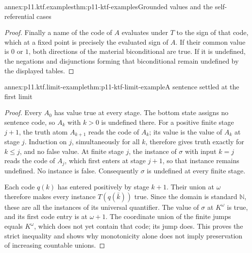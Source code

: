\begin{annexitem}{annex:p11.ktf.examples}{thm:p11-ktf-examples}{Grounded values and the self-referential cases}
\begin{proof}
Finally a name of the code of \(A\) evaluates under \(T\) to the
sign of that code, which at a fixed point is precisely the evaluated
sign of \(A\). If their common value is \(0\) or \(1\), both
directions of the material biconditional are true. If it is undefined,
the negations and disjunctions forming that biconditional remain
undefined by the displayed tables.
\end{proof}
\end{annexitem}

\begin{annexitem}{annex:p11.ktf.limit-example}{thm:p11-ktf-limit-example}{A sentence settled at the first limit}
\begin{proof}
Every \(A_0\) has value true at every stage. The bottom state assigns
no sentence code, so \(A_k\) with \(k>0\) is undefined there.
For a positive finite stage \(j+1\), the truth atom \(A_{k+1}\)
reads the code of \(A_k\); its value is the value of \(A_k\) at
stage \(j\). Induction on \(j\), simultaneously for all \(k\),
therefore gives truth exactly for \(k\leq j\), and no false value.
At finite stage \(j\), the instance of \(\sigma\) with input
\(k=j\) reads the code of \(A_j\), which first enters at stage
\(j+1\), so that instance remains undefined. No instance is false.
Consequently \(\sigma\) is undefined at every finite stage.

Each code \(q(k)\) has entered positively by stage \(k+1\).
Their union at \(\omega\) therefore makes every instance
\(T(q(\bar k))\) true. Since the domain is standard \(\mathbb N\),
these are all the instances of its universal quantifier. The value of
\(\sigma\) at \(K^\omega\) is true, and its first code entry
is at \(\omega+1\). The coordinate union of the finite jumps equals
\(K^\omega\), which does not yet contain that code; its jump does.
This proves the strict inequality and shows why monotonicity alone does
not imply preservation of increasing countable unions.
\end{proof}
\end{annexitem}

